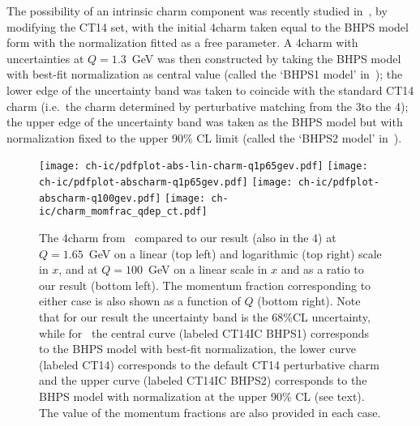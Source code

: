 
The possibility of an intrinsic charm component was recently studied
in~\cite{Hou:2017khm}, by modifying the CT14 \pdf set, with the
initial 4\fns charm \pdf taken equal to the BHPS
model~\cite{Brodsky:1980pb} form with the normalization fitted as a
free parameter.
%
A 4\fns  charm \pdf with uncertainties at $Q=1.3$~GeV was then
constructed by taking 
the BHPS model with best-fit normalization as central value (called
the `BHPS1 model' in~\cite{Hou:2017khm}); the lower
edge of the uncertainty band was taken to coincide with the standard
CT14 charm \pdf  (i.e.\ the charm \pdf determined by perturbative
matching from the 3\fns to the 4\fns); the upper edge of the uncertainty
band was taken as 
the BHPS model but with  normalization fixed to the upper  90\% CL limit (called the
`BHPS2 model' in~\cite{Hou:2017khm}).

\begin{figure}[h]
  \begin{center}
    \texttt{[image: ch-ic/pdfplot-abs-lin-charm-q1p65gev.pdf]}
    \texttt{[image: ch-ic/pdfplot-abscharm-q1p65gev.pdf]}
    \texttt{[image: ch-ic/pdfplot-abscharm-q100gev.pdf]}	
    \texttt{[image: ch-ic/charm\_momfrac\_qdep\_ct.pdf]}
    \caption{\small The 4\fns charm \pdf
    from~\cite{Hou:2017khm} compared to our result (also in the 4\fns) 
     at $Q=1.65$~GeV on
    a linear (top left) and logarithmic (top right) scale in $x$, and
    at  $Q=100$~GeV on a linear scale in $x$ and as a ratio to our result
    (bottom left).
    The momentum fraction corresponding to either case
    is also shown as a function of $Q$ (bottom right). Note that for
    our result the uncertainty band is the 68\%CL \pdf uncertainty,
    while for~\cite{Hou:2017khm} the central curve (labeled
    CT14IC BHPS1) corresponds to the BHPS model with best-fit
    normalization, the lower curve (labeled
    CT14) corresponds to the default CT14 perturbative charm \pdf and
    the upper curve (labeled
    CT14IC BHPS2) corresponds to the BHPS model with normalization at
    the upper 90\% CL (see text). The value of the momentum fractions
    are also provided in each case.
  \label{fig:ic/comparison_CT14} }
\end{center}
\end{figure}

